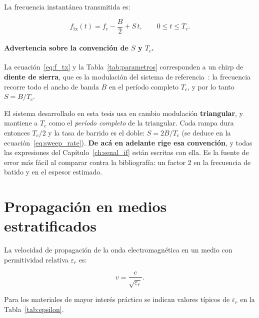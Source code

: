\documentclass[12pt, a4paper, twoside]{report}
\begin{document}
La frecuencia instantánea transmitida es:

\begin{equation}
  f_\text{tx}(t) = f_c - \frac{B}{2} + S\,t,
  \qquad 0 \leq t \leq T_c.
  \label{eq:f_tx}
\end{equation}

\paragraph{Advertencia sobre la convención de $S$ y $T_c$.}
La ecuación~\eqref{eq:f_tx} y la Tabla~\ref{tab:parametros} corresponden a un
chirp de \textbf{diente de sierra}, que es la modulación del sistema de
referencia~\cite{Huang2022}: la frecuencia recorre todo el ancho de banda $B$
en el período completo $T_c$, y por lo tanto $S = B/T_c$.

El sistema desarrollado en esta tesis usa en cambio modulación
\textbf{triangular}, y mantiene a $T_c$ como el \emph{período completo} de la
triangular. Cada rampa dura entonces $T_c/2$ y la tasa de barrido es el doble:
$S = 2B/T_c$ (se deduce en la ecuación~\eqref{eq:sweep_rate}). \textbf{De acá en
adelante rige esa convención}, y todas las expresiones del
Capítulo~\ref{ch:senal_if} están escritas con ella. Es la fuente de error más
fácil al comparar contra la bibliografía: un factor 2 en la frecuencia de batido
y en el espesor estimado.

\section{Propagación en medios estratificados}

La velocidad de propagación de la onda electromagnética en un medio
con permitividad relativa $\varepsilon_r$ es:

\begin{equation}
  v = \frac{c}{\sqrt{\varepsilon_r}}.
  \label{eq:velocidad_medio}
\end{equation}

Para los materiales de mayor interés práctico se indican valores
típicos de $\varepsilon_r$ en la Tabla~\ref{tab:epsilon}.
\end{document}
